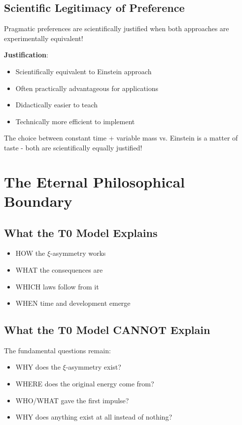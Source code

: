 \documentclass[12pt,a4paper]{article}
\newcommand{\xipar}{\xi}
\theoremstyle{definition}
\theoremstyle{remark}
\begin{document}
	\subsection{Scientific Legitimacy of Preference}
	
	\begin{tcolorbox}[colback=green!5!white,colframe=green!75!black,title=Important Insight]
		Pragmatic preferences are scientifically justified when both approaches are experimentally equivalent!
	\end{tcolorbox}
	
	\textbf{Justification}:
	\begin{itemize}
		\item Scientifically equivalent to Einstein approach
		\item Often practically advantageous for applications
		\item Didactically easier to teach
		\item Technically more efficient to implement
	\end{itemize}
	
	The choice between constant time + variable mass vs. Einstein is a matter of taste - both are scientifically equally justified!
	
	\section{The Eternal Philosophical Boundary}
	
	\subsection{What the T0 Model Explains}
	
	\begin{itemize}
		\item HOW the $\xipar$-asymmetry works
		\item WHAT the consequences are
		\item WHICH laws follow from it
		\item WHEN time and development emerge
	\end{itemize}
	
	\subsection{What the T0 Model CANNOT Explain}
	
	The fundamental questions remain:
	\begin{itemize}
		\item WHY does the $\xipar$-asymmetry exist?
		\item WHERE does the original energy come from?
		\item WHO/WHAT gave the first impulse?
		\item WHY does anything exist at all instead of nothing?
	\end{itemize}
	
\end{document}
